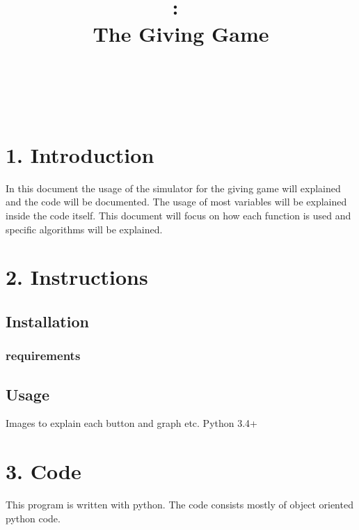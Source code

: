 \documentclass{article}
\title{
\vspace{2in}
\textmd{\textbf{\hmwkClass:\ \hmwkTitle}}\\
\textmd{The Giving Game}\\
\normalsize\vspace{0.1in}\small{\hmwkDueDate}\\
\vspace{0.1in}\large{\textit{\hmwkClassInstructor\ \hmwkClassTime}}
\vspace{3in}
}
\author{\textbf{\hmwkAuthorName}}
\date{} %
\begin{document}
\maketitle



\newpage
\tableofcontents
\newpage



\section{1. Introduction}
In this document the usage of the simulator for the giving game will explained and the code will be documented. The usage of most variables will be explained inside the code itself. This document will focus on how each function is used and specific algorithms will be explained.

\section{2. Instructions}

\subsection{Installation}

\subsubsection{requirements}

\subsection{Usage}
Images to explain each button and graph etc.
Python 3.4+

\section{3. Code}
This program is written with python. The code consists mostly of object oriented python code.
\end{document}
